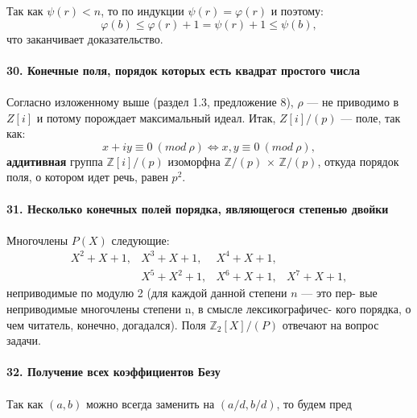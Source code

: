 Так как $\psi(r) < n$, то по индукции $\psi(r) = \varphi(r)$ и поэтому:
$$\varphi(b) \leqslant \varphi(r) + 1 = \psi(r) + 1 \leqslant \psi(b),$$
что заканчивает доказательство.\\
\\
\noindent\textbf{30. Конечные поля, порядок которых есть квадрат\linebreak
простого числа}\\
\\
\hspace*{15pt}Согласно изложенному выше (раздел 1.3, предложение 8), $\rho$ --- не­\linebreak
приводимо в $Z[i]$ и потому порождает максимальный идеал. Итак,\linebreak
$Z[i]/(p)$ ---  поле, так как:
$$x + iy \equiv 0 ~(mod~ \rho) \Longleftrightarrow x, y \equiv 0 ~(mod~ \rho ),$$
\textbf{аддитивная} группа $\mathbb{Z}[i]/(p)$  изоморфна $\mathbb{Z}/(p)$ $\times$ $\mathbb{Z}/(p)$, откуда порядок\linebreak
поля, о котором идет речь, равен $p^{2}$.\\
\\
\noindent\textbf{31. Несколько конечных полей порядка, являющегося\linebreak
степенью двойки}\\
\\
Многочлены $P(X)$ следующие:
			$$\begin{array}{llll}
							 X^2 + X + 1,   & X^3 + X + 1,   & X^4 + X + 1,\\ 
			                          & X^5 + X^2 + 1, & X^6 + X + 1, & X^7 + X + 1, 
			\end{array}$$
\newpage
\noindent неприводимые по модулю 2 (для каждой данной степени $n$ --- это пер-\linebreak 
вые неприводимые многочлены степени n, в смысле лексикографичес-­\linebreak
кого порядка, о чем читатель, конечно, догадался). Поля $\mathbb{Z}_2[X]/(P)$\linebreak
отвечают на вопрос задачи.\\
\\
\noindent\textbf{32. Получение всех коэффициентов Безу}\\
\\
\hspace*{15pt}Так как $(a, b)$ можно всегда заменить на $(a/d, b/d)$, то будем пред­\linebreak
